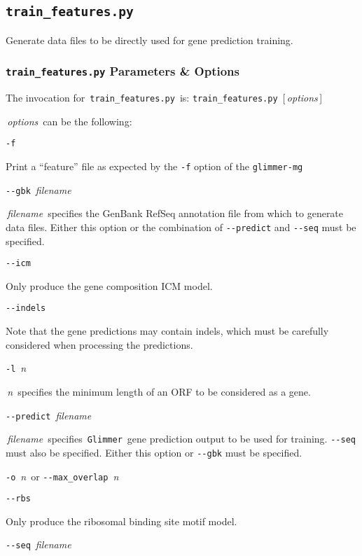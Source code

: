 \documentclass[fleqn,titlepage,11pt]{article}
\def\Desc#1{\,\mbox{\emph{#1}}\,}
\def\Pg#1{\texttt{#1}}
\begin{document}
\subsection{\Pg{train\_features.py}}

Generate data files to be directly used for gene prediction training.

\subsubsection{\Pg{train\_features.py} Parameters \& Options}

The invocation for \,\Pg{train\_features.py}\, is:
\bq
  \Pg{train\_features.py}\, [\Desc{options}]
\eq

\Desc{options} can be the following:
\bl{}\RaggedRight

\exdent
  \verb`-f`

  Print a ``feature'' file as expected by the \verb`-f` option of the
  \Pg{glimmer-mg}

\exdent
  \verb`--gbk` \Desc{filename}

  \Desc{filename} specifies the GenBank RefSeq annotation file from
  which to generate data files. Either this option or the combination
  of \verb`--predict` and \verb`--seq` must be specified.

\exdent
  \verb`--icm`

  Only produce the gene composition ICM model.

\exdent
  \verb`--indels`

  Note that the gene predictions may contain indels, which must be
  carefully considered when processing the predictions.

\exdent
  \verb`-l` \Desc{n}

  \Desc{n} specifies the minimum length of an ORF to be considered
  as a gene.

\exdent
  \verb`--predict` \Desc{filename}

  \Desc{filename} specifies \,\Pg{Glimmer}\, gene prediction output to
  be used for training. \verb`--seq` must also be specified. Either
  this option or \verb`--gbk` must be specified.

\exdent
  \verb`-o` \Desc{n} \enskip or \enskip \verb`--max_overlap` \Desc{n}

\exdent
  \verb`--rbs`

  Only produce the ribosomal binding site motif model.

\exdent
  \verb`--seq` \Desc{filename}
\end{document}
